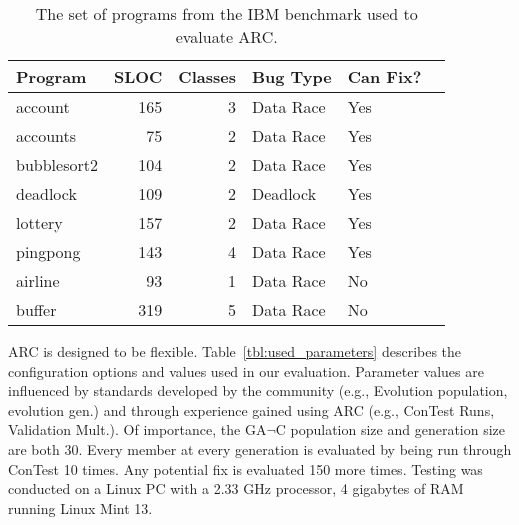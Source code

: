 \documentclass{llncs}
\begin{document}
\begin{table}[h]
\caption{The set of programs from the IBM benchmark used to evaluate ARC.}
\begin{center}
\begin{tabular}{|l|r|r|l|l|p{4.5cm}|}
\hline
\textbf{Program} & \textbf{SLOC} & \textbf{Classes} & \textbf{Bug Type} & \textbf{Can Fix?}\\
\hline
account & 165 & 3 & Data Race & Yes\\
\hline
accounts & 75 & 2 & Data Race & Yes\\
\hline
bubblesort2 & 104 & 2 & Data Race & Yes\\
\hline

deadlock & 109 & 2 & Deadlock & Yes\\
\hline
lottery & 157 & 2 & Data Race & Yes\\
\hline
pingpong & 143 & 4 & Data Race & Yes\\
\hline
airline & 93 & 1 & Data Race & No\\
\hline
buffer & 319 & 5 & Data Race & No\\
\hline
\end{tabular}
\label{tbl:used_programs}
\end{center}
\end{table}

ARC is designed to be flexible. Table~\ref{tbl:used_parameters} describes the configuration options and values used in our evaluation. Parameter values are influenced by standards developed by the community (e.g., Evolution population, evolution gen.) and through experience gained using ARC (e.g., ConTest Runs, Validation Mult.). Of importance, the GA$\neg$C population size and generation size are both 30.  Every member at every generation is evaluated by being run through ConTest 10 times.  Any potential fix is evaluated 150 more times. Testing was conducted on a Linux PC with a 2.33 GHz processor, 4 gigabytes of RAM running Linux Mint 13.
\end{document}
